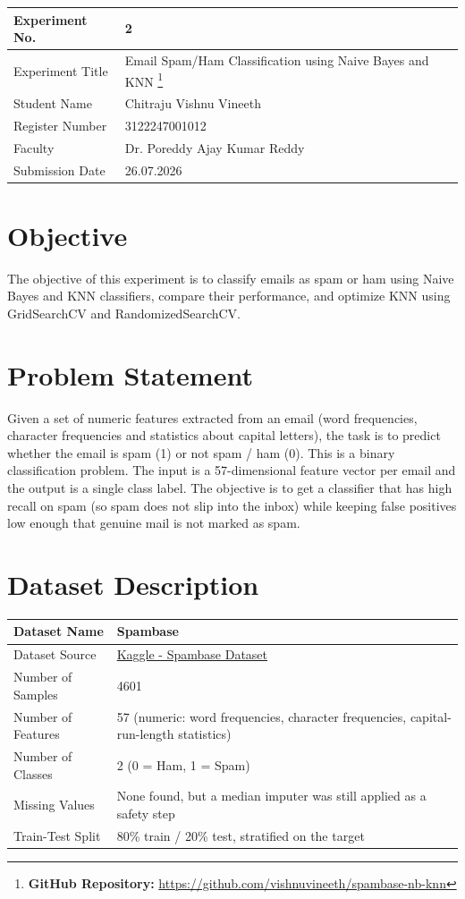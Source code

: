 \documentclass[12pt,a4paper]{article}
\begin{document}
\begin{tabular}{|p{4cm}|p{11cm}|}
\hline
Experiment No. & 2 \\ \hline
Experiment Title & Email Spam/Ham Classification using Naive Bayes and KNN
\footnote{\textbf{GitHub Repository: }\url{https://github.com/vishnuvineeth/spambase-nb-knn}}\\ \hline
Student Name & Chitraju Vishnu Vineeth \\ \hline
Register Number & 3122247001012 \\ \hline
Faculty & Dr. Poreddy Ajay Kumar Reddy \\ \hline
Submission Date & 26.07.2026 \\ \hline
\end{tabular}

\section{Objective}
The objective of this experiment is to classify emails as spam or ham using Naive Bayes and KNN classifiers, compare their performance, and optimize KNN using GridSearchCV and RandomizedSearchCV.

\section{Problem Statement}
Given a set of numeric features extracted from an email (word frequencies, character frequencies and statistics about capital letters), the task is to predict whether the email is spam (1) or not spam / ham (0). This is a binary classification problem. The input is a 57-dimensional feature vector per email and the output is a single class label. The objective is to get a classifier that has high recall on spam (so spam does not slip into the inbox) while keeping false positives low enough that genuine mail is not marked as spam.

\section{Dataset Description}
\begin{longtable}{|p{6cm}|p{8cm}|}
\hline
Dataset Name & Spambase \\ \hline
Dataset Source & \href{https://www.kaggle.com/datasets/somesh24/spambase}{Kaggle - Spambase Dataset} \\ \hline
Number of Samples & 4601 \\ \hline
Number of Features & 57 (numeric: word frequencies, character frequencies, capital-run-length statistics) \\ \hline
Number of Classes & 2 (0 = Ham, 1 = Spam) \\ \hline
Missing Values & None found, but a median imputer was still applied as a safety step \\ \hline
Train-Test Split & 80\% train / 20\% test, stratified on the target \\ \hline
\end{longtable}
\end{document}
